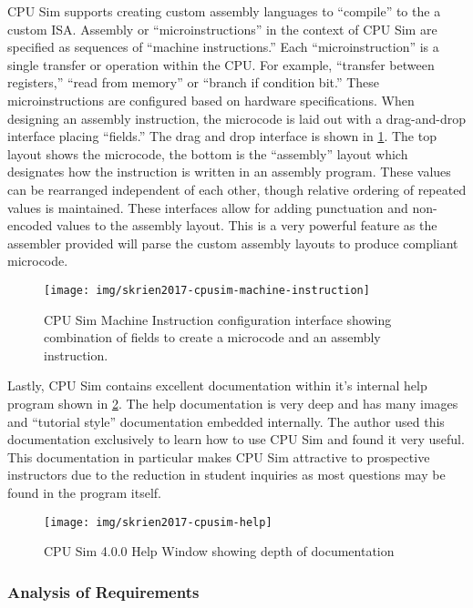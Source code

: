 CPU Sim supports creating custom assembly languages to ``compile'' to the a custom ISA. Assembly or ``microinstructions'' in the context of CPU Sim are specified as sequences of ``machine instructions.'' Each ``microinstruction'' is a single transfer or operation within the CPU. For example, ``transfer between registers,'' ``read from memory'' or ``branch if condition bit.'' These microinstructions are configured based on hardware specifications. When designing an assembly instruction, the microcode is laid out with a drag-and-drop interface placing ``fields.'' The drag and drop interface is shown in \cref{fig:skrien2017-cpusim-machine-instruction}. The top layout shows the microcode, the bottom is the ``assembly'' layout which designates how the instruction is written in an assembly program. These values can be rearranged independent of each other, though relative ordering of repeated values is maintained. These interfaces allow for adding punctuation and non-encoded values to the assembly layout. This is a very powerful feature as the assembler provided will parse the custom assembly layouts to produce compliant microcode.

\begin{figure}[t!]
    \centering
    \texttt{[image: img/skrien2017-cpusim-machine-instruction]}
    \caption{CPU Sim Machine Instruction configuration interface showing combination of fields to create a microcode and an assembly instruction.}
    \label{fig:skrien2017-cpusim-machine-instruction}
\end{figure}

Lastly, CPU Sim contains excellent documentation within it's internal help program shown in \cref{fig:skrien2017-cpusim-help}. The help documentation is very deep and has many images and ``tutorial style'' documentation embedded internally. The author used this documentation exclusively to learn how to use CPU Sim and found it very useful. This documentation in particular makes CPU Sim attractive to prospective instructors due to the reduction in student inquiries as most questions may be found in the program itself. 

\begin{figure}[hb!]
    \centering
    \texttt{[image: img/skrien2017-cpusim-help]}
    \caption{CPU Sim 4.0.0 Help Window showing depth of documentation \cite{Skrien2017}}
    \label{fig:skrien2017-cpusim-help}
\end{figure}

\subsubsection*{Analysis of Requirements}

